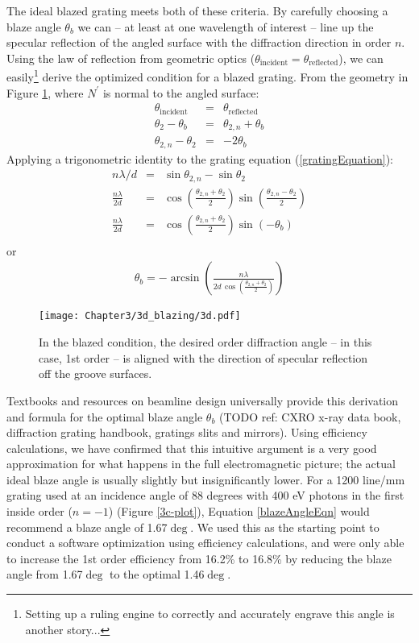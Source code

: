 The ideal blazed grating meets both of these criteria.  By carefully choosing a blaze angle $\theta_b$ we can -- at least at one wavelength of interest -- line up the specular reflection of the angled surface with the diffraction direction in order $n$.  Using the law of reflection from geometric optics ($\theta_{\mathrm{incident}} = \theta_{\mathrm{reflected}}$), we can easily\footnote{Setting up a ruling engine to correctly and accurately engrave this angle is another story...} derive the optimized condition for a blazed grating.  From the geometry in Figure \ref{3d}, where $N^\prime$ is normal to the angled surface: 
\begin{eqnarray}
\theta_{\mathrm{incident}} &=& \theta_{\mathrm{reflected}} \\
\theta_2 - \theta_b &=& \theta_{2,n} + \theta_b \\
\theta_{2,n} - \theta_{2} &=& -2 \theta_b
\end{eqnarray}
Applying a trigonometric identity to the grating equation (\ref{gratingEquation}):
\begin{eqnarray}
n\lambda / d &=& \sin\theta_{2,n} - \sin\theta_{2} \\
\frac{n\lambda}{2d} &=& \cos \left( \frac{\theta_{2,n} + \theta_{2}}{2} \right) \sin \left( \frac{\theta_{2,n} - \theta_{2}}{2} \right) \\
\frac{n\lambda}{2d} &=& \cos \left( \frac{\theta_{2,n} + \theta_{2}}{2} \right) \sin \left( -\theta_b \right) \\
\end{eqnarray}
or
\begin{eqnarray}
\label{blazeAngleEqn}
\theta_b = -\arcsin \left(   \frac{n \lambda}{2d \, \cos \left( \frac{\theta_{2,n} + \theta_{2}}{2} \right)}     \right)
\end{eqnarray}

\begin{figure}[htbp] %
   \centering
   \texttt{[image: Chapter3/3d\_blazing/3d.pdf]} 
   \caption{In the blazed condition, the desired order diffraction angle -- in this case, 1st order -- is aligned with the direction of specular reflection off the groove surfaces.}
   \label{3d}
\end{figure}

Textbooks and resources on beamline design universally provide this derivation and formula for the optimal blaze angle $\theta_b$ (TODO ref: CXRO x-ray data book, diffraction grating handbook, gratings slits and mirrors).  Using efficiency calculations, we have confirmed that this intuitive argument is a very good approximation for what happens in the full electromagnetic picture; the actual ideal blaze angle is usually slightly but insignificantly lower.  For a 1200 line/mm grating used at an incidence angle of 88 degrees with 400 eV photons in the first inside order ($n=-1$) (Figure \ref{3c-plot}), Equation \ref{blazeAngleEqn} would recommend a blaze angle of 1.67$\deg$.  We used this as the starting point to conduct a software optimization using efficiency calculations, and were only able to increase the 1st order efficiency from 16.2\% to 16.8\% by reducing the blaze angle from 1.67$\deg$ to the optimal 1.46$\deg$.

